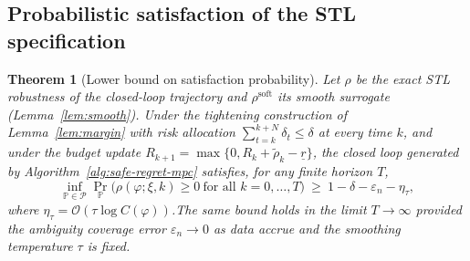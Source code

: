 \documentclass[journal]{IEEEtran}
\newtheorem{theorem}{Theorem}
\theoremstyle{definition}
\begin{document}
\subsection{Probabilistic satisfaction of the STL specification}

\begin{theorem}[Lower bound on satisfaction probability]
\label{thm:sat}
Let $\rho$ be the exact STL robustness of the closed-loop trajectory and
$\rho^{\mathrm{soft}}$ its smooth surrogate (Lemma~\ref{lem:smooth}).
Under the tightening construction of Lemma~\ref{lem:margin} with risk allocation
$\sum_{t=k}^{k+N}\delta_t\le \delta$ at every time $k$, and under the budget update
$R_{k+1}=\max\{0,R_k+\widetilde\rho_k-\underline r\}$, the closed loop generated by
Algorithm~\ref{alg:safe-regret-mpc} satisfies, for any finite horizon $T$,
\[
\inf_{\mathbb{P}\in\mathcal{P}}\Pr_{\mathbb{P}}\!\Big(\rho(\varphi;\xi,k)\ge 0
\ \text{for all } k=0,\dots,T\Big)
\ \ge\ 1-\delta-\varepsilon_n-\eta_\tau,
\]
where $\eta_\tau=\mathcal{O}(\tau\log C(\varphi))$.The same bound holds in the limit $T\to\infty$ provided the ambiguity coverage error
$\varepsilon_n\to 0$ as data accrue and the smoothing temperature $\tau$ is fixed.
\end{theorem}
\end{document}
